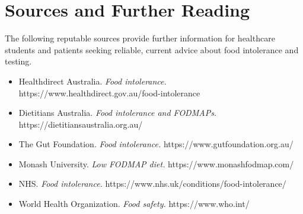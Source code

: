 \section*{Sources and Further Reading}
The following reputable sources provide further information for healthcare students and patients seeking reliable, current advice about food intolerance and testing.
\begin{itemize}
    \item Healthdirect Australia. \textit{Food intolerance.} https://www.healthdirect.gov.au/food-intolerance
    \item Dietitians Australia. \textit{Food intolerance and FODMAPs.} https://dietitiansaustralia.org.au/
    \item The Gut Foundation. \textit{Food intolerance.} https://www.gutfoundation.org.au/
    \item Monash University. \textit{Low FODMAP diet.} https://www.monashfodmap.com/
    \item NHS. \textit{Food intolerance.} https://www.nhs.uk/conditions/food-intolerance/
    \item World Health Organization. \textit{Food safety.} https://www.who.int/
\end{itemize}
